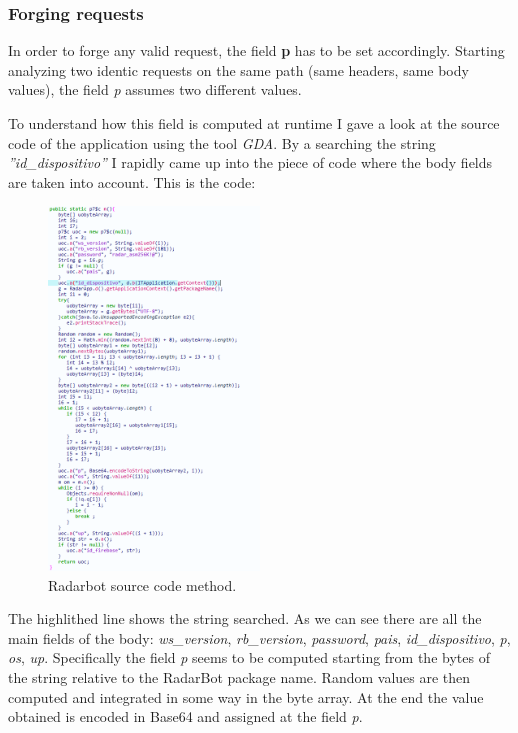 		\subsubsection{Forging requests}
			\par In order to forge any valid request, the field \textbf{p} has to be set accordingly. Starting analyzing two identic requests on the same path (same headers, same body values), the field \textit{p} assumes two different values. \newline
			\par To understand how this field is computed at runtime I gave a look at the source code of the application using the tool \textit{GDA}. By a searching the string \textit{''id\_dispositivo''} I rapidly came up into the piece of code where the body fields are taken into account. This is the code:
			\begin{figure}[H]
				\centering
				\includegraphics[width=0.5\textwidth]{images/radarbot_gda.png}
				\caption{Radarbot source code method.}
			\end{figure}
			\par The highlithed line shows the string searched. As we can see there are all the main fields of the body: \textit{ws\_version}, \textit{rb\_version}, \textit{password}, \textit{pais}, \textit{id\_dispositivo}, \textit{p}, \textit{os}, \textit{up}. Specifically the field \textit{p} seems to be computed starting from the bytes of the string relative to the RadarBot package name. Random values are then computed and integrated in some way in the byte array. At the end the value obtained is encoded in Base64 and assigned at the field \textit{p}.\newline
